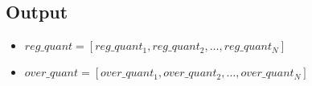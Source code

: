 \documentclass{article}
\begin{document}
\subsection*{Output}
\begin{itemize}
    \item $reg\_quant = [reg\_quant_1, reg\_quant_2, \ldots, reg\_quant_N]$
    \item $over\_quant = [over\_quant_1, over\_quant_2, \ldots, over\_quant_N]$
\end{itemize}
\end{document}
